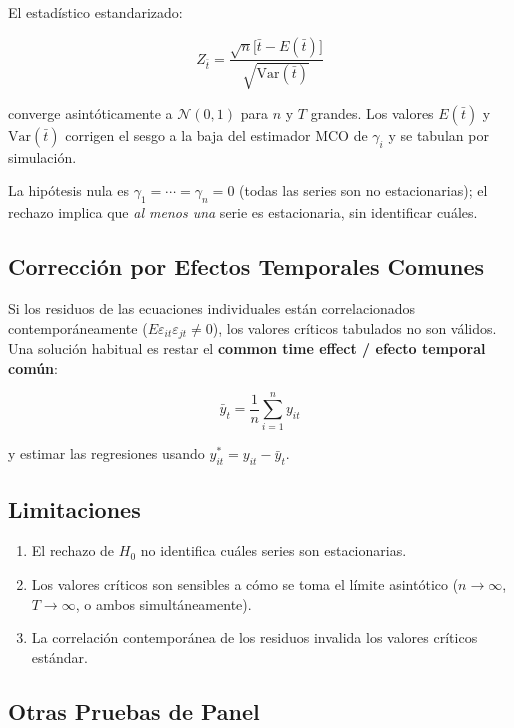 \documentclass[12pt]{article}
\begin{document}
El estad\'istico estandarizado:

\begin{equation}
  Z_{\bar{t}} = \frac{\sqrt{n}\bigl[\bar{t} - E(\bar{t})\bigr]}
                     {\sqrt{\mathrm{Var}(\bar{t})}}
\end{equation}

converge asint\'oticamente a $\mathcal{N}(0,1)$ para $n$ y $T$ grandes.
Los valores $E(\bar{t})$ y $\mathrm{Var}(\bar{t})$ corrigen el sesgo a
la baja del estimador MCO de $\gamma_i$ y se tabulan por simulaci\'on.

La hip\'otesis nula es $\gamma_1 = \cdots = \gamma_n = 0$ (todas las series
son no estacionarias); el rechazo implica que \emph{al menos una} serie
es estacionaria, sin identificar cu\'ales.

\subsection{Correcci\'on por Efectos Temporales Comunes}

Si los residuos de las ecuaciones individuales est\'an correlacionados
contempor\'aneamente ($E\varepsilon_{it}\varepsilon_{jt} \neq 0$), los
valores cr\'iticos tabulados no son v\'alidos. Una soluci\'on habitual es
restar el \textbf{common time effect / efecto temporal com\'un}:

\begin{equation}
  \bar{y}_t = \frac{1}{n}\sum_{i=1}^{n} y_{it}
\end{equation}

y estimar las regresiones usando $y_{it}^* = y_{it} - \bar{y}_t$.

\subsection{Limitaciones}

\begin{enumerate}
  \item El rechazo de $H_0$ no identifica cu\'ales series son estacionarias.
  \item Los valores cr\'iticos son sensibles a c\'omo se toma el l\'imite
        asint\'otico ($n \to \infty$, $T \to \infty$, o ambos simult\'aneamente).
  \item La correlaci\'on contempor\'anea de los residuos invalida los
        valores cr\'iticos est\'andar.
\end{enumerate}

\subsection{Otras Pruebas de Panel}
\end{document}
